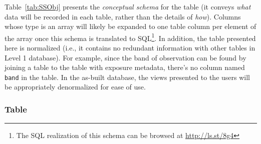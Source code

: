 Table~\ref{tab:SSObj}  presents the {\em conceptual schema} for the \SSObject table (it conveys {\em what} data
will be recorded in each table, rather than the details of {\em how}).
Columns whose type is an array will likely be expanded to one table column per element of the array
once this schema is translated to SQL\footnote{The SQL realization of this schema can be browsed at \url{http://ls.st/8g4}}. In addition, the table presented here is normalized (i.e., it contains no redundant
information with other tables in Level 1 database). For example, since the band of observation can be found
by joining a \DIASource table to the table with exposure metadata, there's no column named {\tt band} in the \DIASource table. In the as-built database, the views presented to the users will be appropriately denormalized
for ease of use.

\subsubsection{\SSObject Table}

